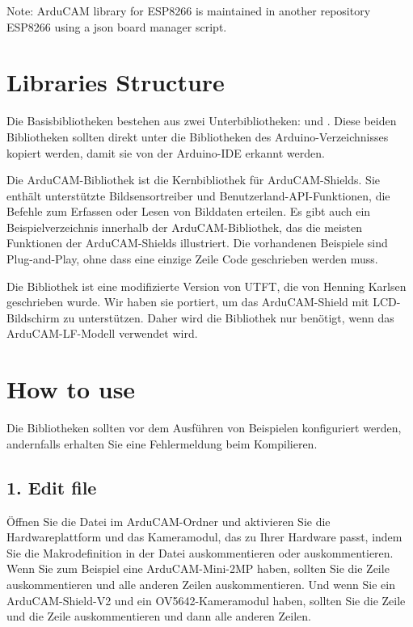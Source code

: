 Note: ArduCAM library for ESP8266 is maintained in another repository ESP8266 using a json board manager script.


\section{Libraries Structure}

Die Basisbibliotheken bestehen aus zwei Unterbibliotheken:  und . Diese beiden Bibliotheken sollten direkt unter die Bibliotheken des Arduino-Verzeichnisses kopiert werden, damit sie von der Arduino-IDE erkannt werden.

Die ArduCAM-Bibliothek ist die Kernbibliothek für ArduCAM-Shields. Sie enthält unterstützte Bildsensortreiber und Benutzerland-API-Funktionen, die Befehle zum Erfassen oder Lesen von Bilddaten erteilen. Es gibt auch ein Beispielverzeichnis innerhalb der ArduCAM-Bibliothek, das die meisten Funktionen der ArduCAM-Shields illustriert. Die vorhandenen Beispiele sind Plug-and-Play, ohne dass eine einzige Zeile Code geschrieben werden muss.

Die Bibliothek  ist eine modifizierte Version von UTFT, die von Henning Karlsen geschrieben wurde. Wir haben sie portiert, um das ArduCAM-Shield mit LCD-Bildschirm zu unterstützen. Daher wird die Bibliothek  nur benötigt, wenn das ArduCAM-LF-Modell verwendet wird.




\section{How to use}

Die Bibliotheken sollten vor dem Ausführen von Beispielen konfiguriert werden, andernfalls erhalten Sie eine Fehlermeldung beim Kompilieren.

\subsection{1. Edit  file}

Öffnen Sie die Datei  im ArduCAM-Ordner und aktivieren Sie die Hardwareplattform und das Kameramodul, das zu Ihrer Hardware passt, indem Sie die Makrodefinition in der Datei auskommentieren oder auskommentieren. Wenn Sie zum Beispiel eine ArduCAM-Mini-2MP haben, sollten Sie die Zeile  auskommentieren und alle anderen Zeilen auskommentieren. Und wenn Sie ein ArduCAM-Shield-V2 und ein OV5642-Kameramodul haben, sollten Sie die Zeile  und die Zeile  auskommentieren und dann alle anderen Zeilen.

